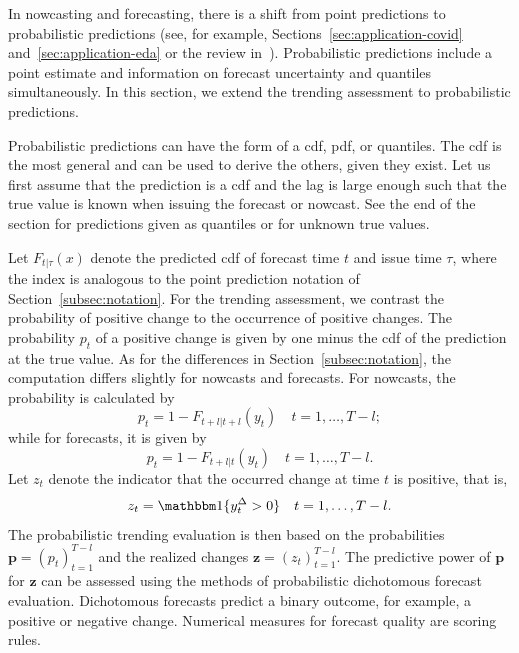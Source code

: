 In nowcasting and forecasting, there is a shift from point predictions to probabilistic predictions (see, for example, Sections~\ref{sec:application-covid} and~\ref{sec:application-eda} or the review in~\cite{Gneiting2014}).
Probabilistic predictions include a point estimate and information on forecast uncertainty and quantiles simultaneously.
In this section, we extend the trending assessment to probabilistic predictions.

Probabilistic predictions can have the form of a \ac{cdf}, \ac{pdf}, or quantiles.
The \ac{cdf} is the most general and can be used to derive the others, given they exist.
Let us first assume that the prediction is a \ac{cdf} and the lag is large enough such that the true value is known when issuing the forecast or nowcast.
See the end of the section for predictions given as quantiles or for unknown true values.

Let $F_{t | \tau} (x)$ denote the predicted \ac{cdf} of forecast time $t$ and issue time $\tau$, where the index is analogous to the point prediction notation of Section~\ref{subsec:notation}.
For the trending assessment, we contrast the probability of positive change to the occurrence of positive changes. 
The probability $p_t$ of a positive change is given by one minus the \ac{cdf} of the prediction at the true value. 
As for the differences in Section~\ref{subsec:notation}, the computation differs slightly for nowcasts and forecasts.
For nowcasts, the probability is calculated by
\begin{equation*}
    p_t = 1 - F_{t+l | t+l} (y_{t})\quad t = 1, \dots, T-l;
\end{equation*}
while for forecasts, it is given by
\begin{equation*}
    p_t = 1 - F_{t+l | t} (y_{t})\quad t = 1, \dots, T-l.
\end{equation*}
Let $z_t$ denote the indicator that the occurred change at time $t$ is positive, that is,
\begin{equation*}
    z_t = \ind{\diffyt > 0} \quad t = 1, \dots, T-l.
\end{equation*}
The probabilistic trending evaluation is then based on the probabilities $\mathbf{p} = (p_t)_{t=1}^{T-l}$ and the realized changes $\mathbf{z} = (z_t)_{t=1}^{T-l}$.
The predictive power of $\mathbf{p}$ for $\mathbf{z}$ can be assessed using the methods of probabilistic dichotomous forecast evaluation.
Dichotomous forecasts predict a binary outcome, for example, a positive or negative change.
Numerical measures for forecast quality are scoring rules.

